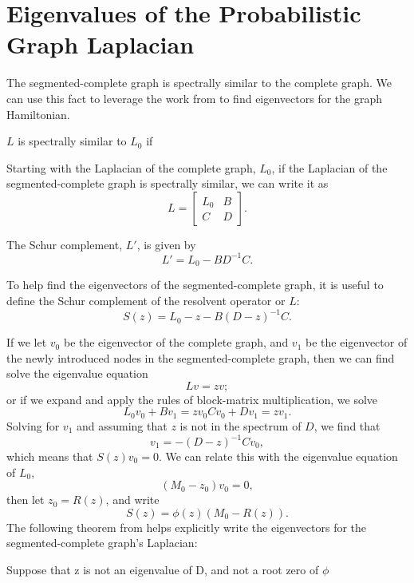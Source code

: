 \section{Eigenvalues of the Probabilistic Graph Laplacian}
The segmented-complete graph is spectrally similar to the complete graph.
We can use this fact to leverage the work from \cite{VibrationModes} to find eigenvectors for the graph Hamiltonian.
\begin{definition}
$L$ is spectrally similar to $L_0$ if
\end{definition}

Starting with the Laplacian of the complete graph, $L_0$, if the Laplacian of the segmented-complete graph is spectrally similar, we can write it as
$$
L = \begin{bmatrix}
L_0 & B \\
C   & D
\end{bmatrix}.
$$

\begin{definition}
The Schur complement, $L'$, is given by
$$
L' = L_0 - BD^{-1}C.
$$
\end{definition}

To help find the eigenvectors of the segmented-complete graph, it is useful to define the Schur complement of the resolvent operator or $L$:
$$
S(z) = L_0 - z - B(D-z)^{-1}C.
$$

If we let $v_0$ be the eigenvector of the complete graph, and $v_1$ be the eigenvector of the newly introduced nodes in the segmented-complete graph, then we can find solve the eigenvalue equation
$$
Lv = zv;
$$
or if we expand and apply the rules of block-matrix multiplication, we solve
$$
L_0v_0 + Bv_1 = zv_0
Cv_0 + Dv_1 = zv_1.
$$
Solving for $v_1$ and assuming that $z$ is not in the spectrum of $D$, we find that
$$
v_1= -(D - z)^{-1}Cv_0,
$$
which means that $S(z)v_0=0$.
We can relate this with the eigenvalue equation of $L_0$,
$$
(M_0 - z_0)v_0 = 0,
$$
then let $z_0 = R(z)$, and write
$$
S(z) = \phi(z)(M_0 - R(z)).
$$
The following theorem from \cite{VibrationModes} helps explicitly write the eigenvectors for the segmented-complete graph's Laplacian:
\begin{theorem}
Suppose that z is not an eigenvalue of D, and not a root zero of $\phi$
\end{theorem}
